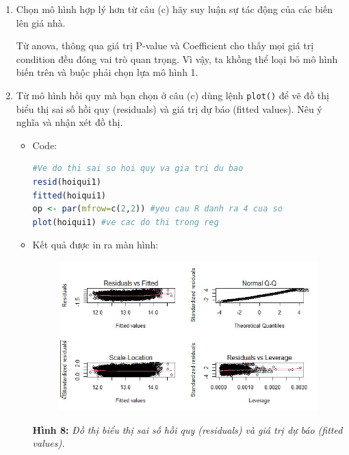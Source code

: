 \documentclass[a4paper]{article}
\theoremstyle{definition}
\begin{document}
\begin{itemize}
\begin{enumerate}
\begin{enumerate}
        
        \item  Chọn mô hình hợp lý hơn từ câu (c) hãy suy luận sự tác động của các biến lên giá nhà.
        
        Từ anova, thông qua giá trị P-value và Coefficient cho thấy mọi giá trị condition đều đóng vai trò quan trọng. Vì vậy, ta khồng thể loại bỏ mô hình biến trên và buộc phải chọn lựa mô hình 1.
        
        \item Từ mô hình hồi quy mà bạn chọn ở câu (c) dùng lệnh \texttt{plot()} để vẽ đồ thị biểu thị sai số hồi quy (residuals) và giá trị dự báo (fitted values). Nêu ý nghĩa và nhận xét đồ thị.
        
        \begin{itemize}
            \item Code:
            \begin{lstlisting}[language=R, caption=Code for question 4e]
#Ve do thi sai so hoi quy va gia tri du bao
resid(hoiqui1)
fitted(hoiqui1) 
op <- par(mfrow=c(2,2)) #yeu cau R danh ra 4 cua so
plot(hoiqui1) #ve cac do thi trong reg
        \end{lstlisting}
        
            \item Kết quả được in ra màn hình:
                \begin{figure}[H]
                \centering
                \includegraphics[scale=0.7]{4e.jpg}
                \label{fig:my_label}
                \end{figure}

            \begin{center}
                \textbf{Hình 8: }\textit{Đồ thị biểu thị sai số hồi quy (residuals) và giá trị dự báo (fitted values).}
            \end{center}
        

\end{itemize}
\end{enumerate}
\end{enumerate}
\end{itemize}
\end{document}
